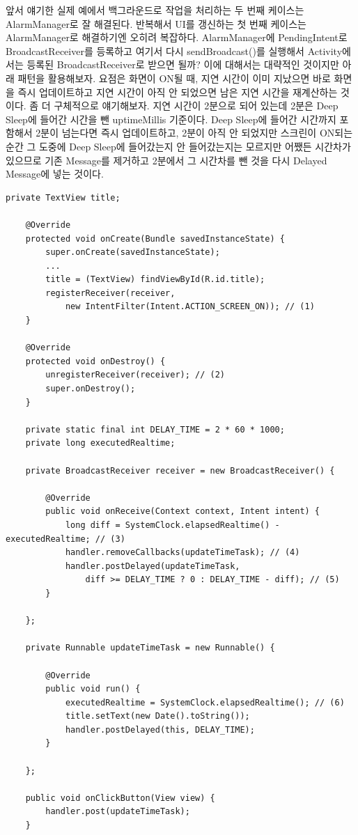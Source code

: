 앞서 얘기한 실제 예에서 백그라운드로 작업을 처리하는 두 번째 케이스는 AlarmManager로 잘 해결된다. 반복해서 UI를 갱신하는 첫 번째 케이스는 AlarmManager로 해결하기엔 오히려 복잡하다. 
AlarmManager에 PendingIntent로 BroadcastReceiver를 등록하고 여기서 다시 sendBroadcast()를 실행해서 Activity에서는 등록된 BroadcastReceiver로 받으면 될까?
이에 대해서는 대략적인 것이지만 아래 패턴을 활용해보자. 
요점은 화면이 ON될 때, 지연 시간이 이미 지났으면 바로 화면을 즉시 업데이트하고 지연 시간이 아직 안 되었으면 남은 지연 시간을 재계산하는 것이다. 
좀 더 구체적으로 얘기해보자. 지연 시간이 2분으로 되어 있는데 2분은 Deep Sleep에 들어간 시간을 뺀 uptimeMillis 기준이다. Deep Sleep에 들어간 시간까지 포함해서 2분이 넘는다면 즉시 업데이트하고, 2분이 아직 안 되었지만 스크린이 ON되는 순간 그 도중에 Deep Sleep에 들어갔는지 안 들어갔는지는 모르지만 어쨌든 시간차가 있으므로 기존 Message를 제거하고 2분에서 그 시간차를 뺀 것을 다시 Delayed Message에 넣는 것이다.
\begin{lstlisting}[frame=single]
	private TextView title;

    @Override
    protected void onCreate(Bundle savedInstanceState) {
        super.onCreate(savedInstanceState);
        ...
		title = (TextView) findViewById(R.id.title);
		registerReceiver(receiver, 
			new IntentFilter(Intent.ACTION_SCREEN_ON)); // (1)
    }
    
    @Override
	protected void onDestroy() {
		unregisterReceiver(receiver); // (2)
		super.onDestroy();
	}
	
	private static final int DELAY_TIME = 2 * 60 * 1000;
	private long executedRealtime;

	private BroadcastReceiver receiver = new BroadcastReceiver() {

		@Override
		public void onReceive(Context context, Intent intent) {
			long diff = SystemClock.elapsedRealtime() - executedRealtime; // (3)
			handler.removeCallbacks(updateTimeTask); // (4)
			handler.postDelayed(updateTimeTask, 
				diff >= DELAY_TIME ? 0 : DELAY_TIME - diff); // (5)
		}

	};

	private Runnable updateTimeTask = new Runnable() {

		@Override
		public void run() {
			executedRealtime = SystemClock.elapsedRealtime(); // (6)
			title.setText(new Date().toString());
			handler.postDelayed(this, DELAY_TIME);
		}

	};

	public void onClickButton(View view) {
		handler.post(updateTimeTask);
	}
\end{lstlisting}
